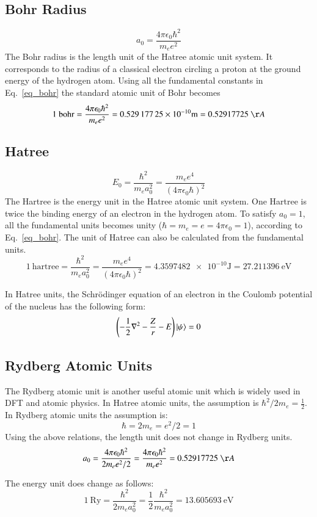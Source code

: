 \subsection{Bohr Radius}
\begin{equation}
\label{eq_bohr}
a_0 = \frac{4\pi\epsilon_0 \hbar^2}{m_ee^2}
\end{equation}
The Bohr radius is the length unit of the Hatree atomic unit system. It corresponds to the radius of a classical electron circling a proton at the ground energy of the hydrogen atom. Using all the fundamental constants in Eq.~\eqref{eq_bohr} the standard atomic unit of Bohr becomes
\begin{equation}
1\ \text{bohr} = \frac{4\pi\epsilon_0 \hbar^2}{m_ee^2} = \num{0.52917725e-10} \text{m} = 0.52917725 \ \AA
\end{equation}


\subsection{Hatree}
\begin{equation}
\label{eq_htr}
 E_0= \frac{\hbar^2}{m_ea_0^2} = \frac{m_ee^4}{(4\pi\epsilon_0\hbar)^2}
\end{equation}
The Hartree is the energy unit in the Hatree atomic unit system. One Hartree is twice the binding energy of an electron in the hydrogen atom. To satisfy $a_0 = 1$, all the fundamental units becomes unity ($\hbar = m_e = e = 4\pi\epsilon_0 = 1$), according to Eq.~\eqref{eq_bohr}. The unit of Hatree can also be calculated from the fundamental units.
\begin{equation}
1\ \text{hartree} = \frac{\hbar^2}{m_ea_0^2} = \frac{m_ee^4}{(4\pi\epsilon_0\hbar)^2} = \num{4.3597482e-10} \text{J} = 27.211396 \  \text{eV}
\end{equation}

In Hatree units, the Schr\"odinger equation of an electron in the Coulomb potential of the nucleus has the following form:
\begin{equation}
\left(-\frac{1}{2}\nabla^2 - \frac{Z}{r} - E \right) \ket{\psi} = 0
\end{equation}

\subsection{Rydberg Atomic Units}
The Rydberg atomic unit is another useful atomic unit which is widely used in DFT and atomic physics. In Hatree atomic units, the assumption is $\hbar^2/2m_e = \frac{1}{2}$. In Rydberg atomic units the assumption is: 
\begin{equation*}
\hbar = 2m_e = e^2/2 = 1
\end{equation*}
Using the above relations, the length unit does not change in Rydberg units.
\begin{equation}
a_0 = \frac{4\pi\epsilon_0 \hbar^2}{2m_ee^2/2} = \frac{4\pi\epsilon_0 \hbar^2}{m_ee^2} = 0.52917725 \ \AA
\end{equation}

The energy unit does change as follows:
\begin{equation}
1\ \text{Ry} =  \frac{\hbar^2}{2m_ea_0^2} = \frac{1}{2} \frac{\hbar^2}{m_ea_0^2} = 13.605693\  \text{eV}
\end{equation}










